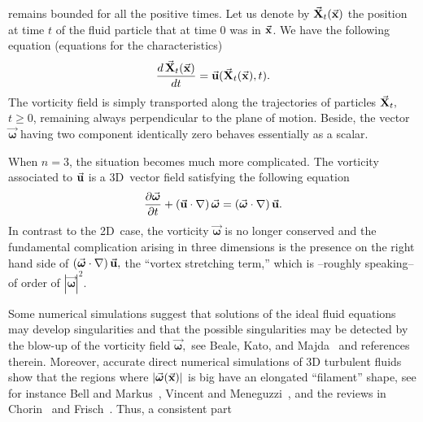 \documentclass[a4paper,11pt]{article}
\numberwithin{equation}{section}
\newcommand{\X}{\mbox{$\vec{\bf X}$}}
\newcommand{\U}{\mbox{$\vec{\bf u}$}}
\newcommand{\vomega}{\mbox{$\vec{\boldsymbol\omega}$}}
\newcommand{\x}{\mbox{$\vec{\bf x}$}}
\begin{document}
remains bounded for all the positive times. Let us denote by
$\X_{t}(\x)$ the position at time $t$ of the fluid particle that at
time 0 was in $\x$.  We have the following equation (equations for the
characteristics) 
\begin{equation}
\frac{d\,\X_{t}(\x)}{dt}=\U(\X_{t}(\x),t).\label{characteristic}
\end{equation}
The vorticity field is simply transported along the trajectories of
particles $\X_t,$ $t\geq 0$, remaining always perpendicular to the
plane of motion. Beside, the vector $\vomega$ having two component
identically zero behaves essentially as a scalar.\par 
%
When $n=3$, the situation becomes much more complicated. The vorticity 
associated to $\U$ is a 3D~vector field satisfying the following
equation
\begin{equation*}%
\frac{\partial \vomega}{\partial t} +(\U\cdot \nabla)\,\vomega=
(\vomega\cdot \nabla)\,\U.
\end{equation*}
In contrast to the 2D~case, the vorticity $\vomega$ is
no longer conserved and the fundamental
complication arising in three dimensions is the presence on the right
hand side of $(\vomega\cdot \nabla)\,\U,$ the ``vortex stretching
term,'' which is --roughly speaking-- of order of $|\vomega|^2$.\par 
%
Some numerical simulations suggest that solutions of the ideal fluid
equations may develop singularities and that the possible
singularities may be detected by the blow-up of the vorticity field
$\vomega,$ see Beale, Kato, and Majda~\cite{MR85j:35154} and
references therein. Moreover, accurate direct numerical simulations of
3D turbulent fluids show that the regions where $|\vomega(\x)|$ is big
have an elongated ``filament'' shape, see for instance Bell and
Markus~\cite{BM}, Vincent and Meneguzzi~\cite{VM}, and the reviews in
Chorin~\cite{MR95m:76043} and Frisch~\cite{f}. Thus, a consistent part
\end{document}
